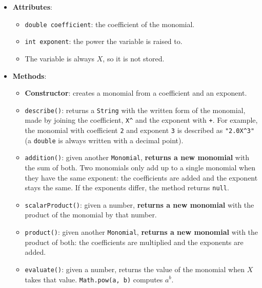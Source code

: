 \begin{itemize}

    \item \textbf{Attributes}:

        \begin{itemize}

            \item \texttt{double coefficient}: the coefficient of the monomial.

            \item \texttt{int exponent}: the power the variable is raised to.

            \item The variable is always \(X\), so it is not stored.

        \end{itemize}

    \item \textbf{Methods}:

        \begin{itemize}

            \item \textbf{Constructor}: creates a monomial from a coefficient and an exponent.

            \item \texttt{describe()}: returns a \texttt{String} with the written form of the monomial, made by joining the coefficient, \texttt{X\textasciicircum{}} and the exponent with \texttt{+}. For example, the monomial with coefficient \texttt{2} and exponent \texttt{3} is described as \texttt{"2.0X\textasciicircum{}3"} (a \texttt{double} is always written with a decimal point).

            \item \texttt{addition()}: given another \texttt{Monomial}, \textbf{returns a new monomial} with the sum of both. Two monomials only add up to a single monomial when they have the same exponent: the coefficients are added and the exponent stays the same. If the exponents differ, the method returns \texttt{null}.

            \item \texttt{scalarProduct()}: given a number, \textbf{returns a new monomial} with the product of the monomial by that number.

            \item \texttt{product()}: given another \texttt{Monomial}, \textbf{returns a new monomial} with the product of both: the coefficients are multiplied and the exponents are added.

            \item \texttt{evaluate()}: given a number, returns the value of the monomial when \(X\) takes that value. \texttt{Math.pow(a, b)} computes \(a^{b}\).

        \end{itemize}

\end{itemize}


